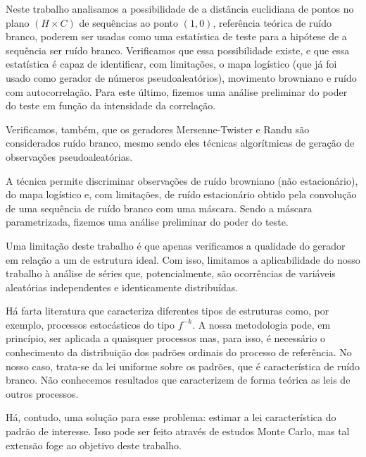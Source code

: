 
Neste trabalho analisamos a possibilidade de a distância euclidiana de pontos no plano $(H\times C)$ de sequências ao ponto $(1,0)$, referência teórica de ruído branco, poderem ser usadas como uma estatística de teste para a hipótese de a sequência ser ruído branco.
Verificamos que essa possibilidade existe, e que essa estatística é capaz de identificar, com limitações, o mapa logístico (que já foi usado como gerador de números pseudoaleatórios), movimento browniano e ruído com autocorrelação.
Para este último, fizemos uma análise preliminar do poder do teste em função da intensidade da correlação.

Verificamos, também, que os geradores Mersenne-Twister e Randu são considerados ruído branco, mesmo sendo eles técnicas algorítmicas de geração de observações pseudoaleatórias.

A técnica permite discriminar observações de ruído browniano (não estacionário), do mapa logístico e, com limitações, de ruído estacionário obtido pela convolução de uma sequência de ruído branco com uma máscara.
Sendo a máscara parametrizada, fizemos uma análise preliminar do poder do teste.

Uma limitação deste trabalho é que apenas verificamos a qualidade do gerador em relação a um de estrutura ideal.
Com isso, limitamos a aplicabilidade do nosso trabalho à análise de séries que, potencialmente, são ocorrências de variáveis aleatórias independentes e identicamente distribuídas.

Há farta literatura que caracteriza diferentes tipos de estruturas como, por exemplo, processos estocásticos do tipo $f^{-k}$.
A nossa metodologia pode, em princípio, ser aplicada a quaisquer processos mas, para isso, é necessário o conhecimento da distribuição dos padrões ordinais do processo de referência.
No nosso caso, trata-se da lei uniforme sobre os padrões, que é característica de ruído branco.
Não conhecemos resultados que caracterizem de forma teórica as leis de outros processos.

Há, contudo, uma solução para esse problema: estimar a lei característica do padrão de interesse.
Isso pode ser feito através de estudos Monte Carlo, mas tal extensão foge ao objetivo deste trabalho.

